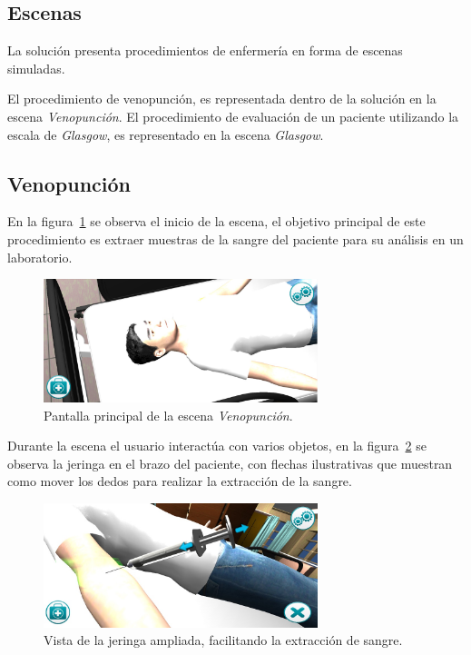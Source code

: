 \subsection{Escenas}

La solución presenta procedimientos de enfermería en forma de escenas simuladas.

El procedimiento de venopunción, es representada dentro de la solución en la
escena \emph{Venopunción}. El procedimiento de evaluación de un paciente
utilizando la escala de \textit{Glasgow}, es representado en la escena
\emph{Glasgow}.

\subsection{Venopunción}

En la figura~\ref{fig:hemocultivo_principal} se observa el inicio de la escena,
el objetivo principal de este procedimiento es extraer muestras de la sangre del
paciente para su análisis en un laboratorio.

\begin{figure}[H]
\centering 
\includegraphics[width=8cm]{../solucion/images/hemocultivo_principal.jpg}
\caption{Pantalla principal de la escena \emph{Venopunción}.}
\label{fig:hemocultivo_principal}
\end{figure}

Durante la escena el usuario interactúa con varios objetos, en la
figura~\ref{fig:hemocultivo_jeringa_zoom} se observa la jeringa en el brazo del
paciente, con flechas ilustrativas que muestran como mover los dedos para
realizar la extracción de la sangre.

\begin{figure}[H]
\centering 
\includegraphics[width=8cm]{../solucion/images/hemocultivo_jeringa_ampliada.jpg}
\caption{Vista de la jeringa ampliada, facilitando la extracción de sangre.}
\label{fig:hemocultivo_jeringa_zoom}
\end{figure}

